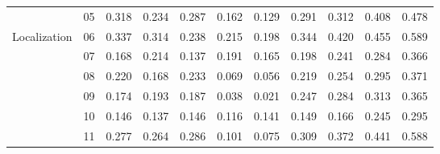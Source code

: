 \documentclass[runningheads]{llncs}
\begin{document}
\begin{table}[h!]
\begin{center}
\begin{tabular}{ccccccccccc}
		& 05 &\cellcolor{blue!60}0.318  &\cellcolor{blue!20}0.234  &\cellcolor{blue!30}0.287  &\cellcolor{blue!10}0.162  &\cellcolor{blue!5}0.129  &\cellcolor{blue!40}0.291  &\cellcolor{blue!50}0.312  &\cellcolor{blue!70}0.408 &\cellcolor{blue!80}\color{white}0.478 \\
		
		Localization & 06  &\cellcolor{blue!40}0.337  &\cellcolor{blue!30}0.314  &\cellcolor{blue!20}0.238  &\cellcolor{blue!10}0.215  &\cellcolor{blue!5}0.198  &\cellcolor{blue!50}0.344  &\cellcolor{blue!60}0.420  &\cellcolor{blue!70}0.455 &\cellcolor{blue!80}\color{white}0.589  \\
		
		& 07 &\cellcolor{blue!20}0.168  &\cellcolor{blue!50}0.214  &\cellcolor{blue!5}0.137  &\cellcolor{blue!30}0.191  &\cellcolor{blue!10}0.165  &\cellcolor{blue!40}0.198  &\cellcolor{blue!60}0.241  &\cellcolor{blue!70}0.284 &\cellcolor{blue!80}\color{white}0.366 \\
		
		& 08 &\cellcolor{blue!40}0.220  &\cellcolor{blue!20}0.168  &\cellcolor{blue!50}0.233  &\cellcolor{blue!10}0.069  &\cellcolor{blue!5}0.056  &\cellcolor{blue!30}0.219  &\cellcolor{blue!60}0.254  &\cellcolor{blue!70}0.295 &\cellcolor{blue!80}\color{white}0.371 \\
		
		& 09 &\cellcolor{blue!20}0.174 &\cellcolor{blue!40}0.193  &\cellcolor{blue!30}0.187  &\cellcolor{blue!10}0.038  &\cellcolor{blue!5}0.021  &\cellcolor{blue!50}0.247  &\cellcolor{blue!60}0.284  &\cellcolor{blue!70}0.313 &\cellcolor{blue!80}\color{white}0.365 \\
		& 10 &\cellcolor{blue!40}0.146  &\cellcolor{blue!20}0.137  &\cellcolor{blue!40}0.146  &\cellcolor{blue!10}0.116  &\cellcolor{blue!30}0.141  &\cellcolor{blue!50}0.149  &\cellcolor{blue!60}0.166  &\cellcolor{blue!70}0.245 &\cellcolor{blue!80}\color{white}0.295 \\
		
		& 11 &\cellcolor{blue!30}0.277 &\cellcolor{blue!20}0.264  &\cellcolor{blue!40}0.286  &\cellcolor{blue!10}0.101  &\cellcolor{blue!5}0.075  &\cellcolor{blue!50}0.309  &\cellcolor{blue!60}0.372  &\cellcolor{blue!70}0.441 &\cellcolor{blue!80}\color{white}0.588 \\
		

\end{tabular}
\end{center}
\end{table}
\end{document}
